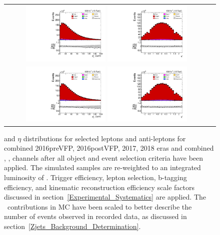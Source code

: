 \begin{figure}[htb]
    \begin{center}
        \begin{tabular}{cc}
            \includegraphics[width=0.40\textwidth]{fig_fullRun2UL/controlplots/combined/HypLeptonpT.pdf}
            \includegraphics[width=0.40\textwidth]{fig_fullRun2UL/controlplots/combined/HypLeptonEta.pdf} \\
            \includegraphics[width=0.40\textwidth]{fig_fullRun2UL/controlplots/combined/HypAntiLeptonpT.pdf}
            \includegraphics[width=0.40\textwidth]{fig_fullRun2UL/controlplots/combined/HypAntiLeptonEta.pdf}
        \end{tabular}
        \caption{\footnotesize \pT and $\eta$ distributions for selected leptons and anti-leptons for combined 2016preVFP, 2016postVFP, 2017, 2018 eras and combined \ee, \emu, \mumu channels after all object and event selection criteria have been applied.
        The simulated samples are re-weighted to an integrated luminosity of \lumivalueRuniiUL.
        Trigger efficiency, lepton selection, b-tagging efficiency, and kinematic reconstruction efficiency scale factors discussed in section~\ref{Experimental_Systematics} are applied.
        The \zjets\ contributions in MC have been scaled to better describe the number of events observed in recorded data, as discussed in section~\ref{Zjets_Background_Determination}.
        }
    \end{center}
\end{figure}

